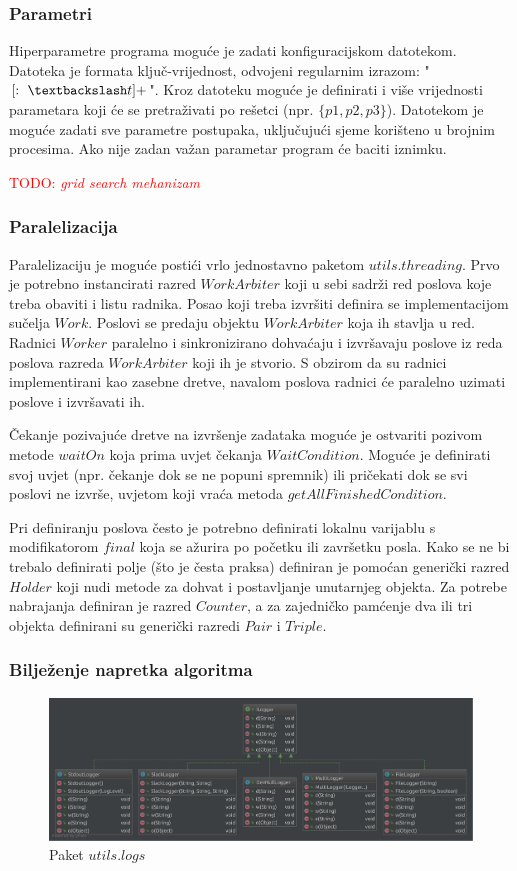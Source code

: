 \documentclass[times, utf8, numeric, diplomski]{fer}
\def\TODO#1{\noindent\textcolor{red}{TODO: \textit{#1}}\newline}
\def\todo#1{\TODO{#1}}
\begin{document}
\subsubsection{Parametri}
Hiperparametre programa moguće je zadati konfiguracijskom datotekom. Datoteka je formata ključ-vrijednost, odvojeni regularnim izrazom: "$[:\ \textbackslash t]+$". Kroz datoteku moguće je definirati i više vrijednosti parametara koji će se pretraživati po rešetci (npr. $\{p1,p2,p3\}$). Datotekom je moguće zadati sve parametre postupaka, uključujući sjeme korišteno u brojnim procesima. Ako nije zadan važan parametar program će baciti iznimku.

\todo{grid search mehanizam}

\subsubsection{Paralelizacija}
Paralelizaciju je moguće postići vrlo jednostavno paketom $utils.threading$. Prvo je potrebno instancirati razred $WorkArbiter$ koji u sebi sadrži red poslova koje treba obaviti i listu radnika. Posao koji treba izvršiti definira se implementacijom sučelja $Work$. Poslovi se predaju objektu $WorkArbiter$ koja ih stavlja u red. Radnici $Worker$ paralelno i sinkronizirano dohvaćaju i izvršavaju poslove iz reda poslova razreda $WorkArbiter$ koji ih je stvorio. S obzirom da su radnici implementirani kao zasebne dretve, navalom poslova radnici će paralelno uzimati poslove i izvršavati ih.

Čekanje pozivajuće dretve na izvršenje zadataka moguće je ostvariti pozivom metode $waitOn$ koja prima uvjet čekanja $WaitCondition$. Moguće je definirati svoj uvjet (npr. čekanje dok se ne popuni spremnik) ili pričekati dok se svi poslovi ne izvrše, uvjetom koji vraća metoda $getAllFinishedCondition$.

Pri definiranju poslova često je potrebno definirati lokalnu varijablu s modifikatorom $final$ koja se ažurira po početku ili završetku posla. Kako se ne bi trebalo definirati polje (što je česta praksa) definiran je pomoćan generički razred $Holder$ koji nudi metode za dohvat i postavljanje unutarnjeg objekta. Za potrebe nabrajanja definiran je razred $Counter$, a za zajedničko pamćenje dva ili tri objekta definirani su generički razredi $Pair$ i $Triple$.

\subsubsection{Bilježenje napretka algoritma}
\begin{figure}[H]
\includegraphics[width=\textwidth]{pkg_logs.pdf}
\centering
\caption{Paket $utils.logs$}
\label{fig:pkg_logs}
\end{figure}
\end{document}

